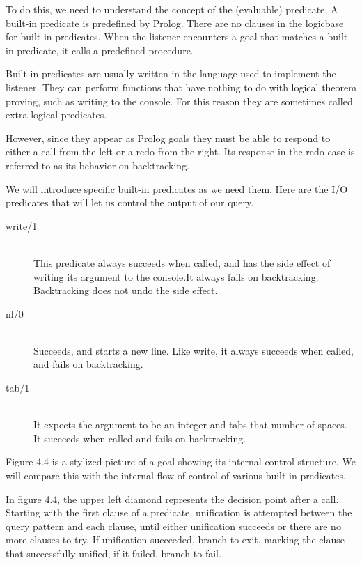 To do this, we need to understand the concept of the  (evaluable)
predicate. A built-in predicate is predefined by Prolog. There are no clauses in
the logicbase for built-in predicates. When the listener encounters a goal that
matches a built-in predicate, it calls a predefined procedure.

Built-in predicates are usually written in the language used to implement the
listener. They can perform functions that have nothing to do with logical
theorem proving, such as writing to the console. For this reason they are
sometimes called extra-logical predicates.

However, since they appear as Prolog goals they must be able to respond to
either a call from the left or a redo from the right. Its response in the redo
case is referred to as its behavior on backtracking.

We will introduce specific built-in predicates as we need them. Here are the I/O
predicates that will let us control the output of our query.
\begin{description}
\item[write/1]\ \\This predicate always succeeds when called, and has the side
effect of writing its argument to the console.It always fails on backtracking.
Backtracking does not undo the side effect.
\item[nl/0]\ \\Succeeds, and starts a new line. Like write, it always succeeds
when called, and fails on backtracking.
\item[tab/1]\ \\It expects the argument to be an integer and tabs that number of
spaces. It succeeds when called and fails on backtracking.
\end{description}

Figure 4.4 is a stylized picture of a goal showing its internal control
structure. We will compare this with the internal flow of control of various
built-in predicates.


In figure 4.4, the upper left diamond represents the decision point after a
call. Starting with the first clause of a predicate, unification is attempted
between the query pattern and each clause, until either unification succeeds or
there are no more clauses to try. If unification succeeded, branch to exit,
marking the clause that successfully unified, if it failed, branch to fail.

